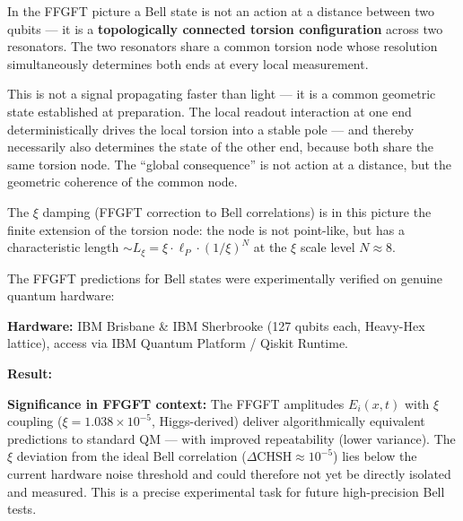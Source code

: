 \begin{foundation}
In the FFGFT picture a Bell state is not an
action at a distance between two qubits ---
it is a \textbf{topologically connected
torsion configuration} across two resonators.
The two resonators share a common
torsion node whose resolution
simultaneously determines both ends
at every local measurement.

This is not a signal propagating faster than light ---
it is a common geometric state established at preparation.
The local readout interaction at one end
deterministically drives the local torsion into a
stable pole --- and thereby necessarily also
determines the state of the other end, because both share the same
torsion node.
The ``global consequence'' is not action at a distance,
but the geometric coherence of the common node.

The $\xi$ damping (FFGFT correction to Bell correlations)
is in this picture the finite extension of the
torsion node: the node is not point-like,
but has a characteristic length
$\sim L_\xi = \xi \cdot \ell_P \cdot (1/\xi)^N$
at the $\xi$ scale level $N \approx 8$.
\end{foundation}

\begin{keyresult}
The FFGFT predictions for Bell states were experimentally
verified on genuine quantum hardware:

\textbf{Hardware:} IBM Brisbane \& IBM Sherbrooke (127 qubits each,
Heavy-Hex lattice), access via IBM Quantum Platform / Qiskit Runtime.

\textbf{Result:}
\begin{center}
{\footnotesize
{}
} %
\end{center}

\textbf{Significance in FFGFT context:}
The FFGFT amplitudes $E_i(x,t)$ with $\xi$ coupling
($\xi = 1.038 \times 10^{-5}$, Higgs-derived) deliver
algorithmically equivalent predictions to standard QM ---
with improved repeatability (lower variance).
The $\xi$ deviation from the ideal Bell correlation
($\Delta\text{CHSH} \approx 10^{-5}$) lies below
the current hardware noise threshold and could therefore
not yet be directly isolated and measured.
This is a precise experimental task for future
high-precision Bell tests.
\end{keyresult}

